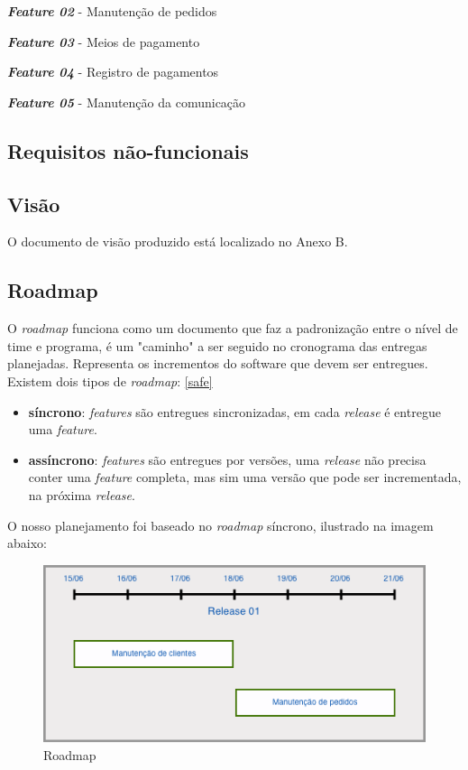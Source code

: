 \textbf{\textit{Feature 02}} - Manutenção de pedidos

\textbf{\textit{Feature 03}} - Meios de pagamento

\textbf{\textit{Feature 04}} - Registro de pagamentos

\textbf{\textit{Feature 05}} - Manutenção da comunicação
\subsection{Requisitos não-funcionais}
\subsection{Visão}
O documento de visão produzido está localizado no Anexo B.
\subsection{Roadmap}
O \textit{roadmap} funciona como um documento que faz a padronização entre o nível de time e programa, é um "caminho" a ser seguido no cronograma das entregas planejadas. Representa os incrementos do software que devem ser entregues. Existem dois tipos de \textit{roadmap}: \ref{safe}
\begin{itemize}
\item \textbf{síncrono}: \textit{features} são entregues sincronizadas, em cada \textit{release} é entregue uma \textit{feature}.
\item \textbf{assíncrono}: \textit{features} são entregues por versões, uma \textit{release} não precisa conter uma \textit{feature} completa, mas sim uma versão que pode ser incrementada, na próxima \textit{release}.
\end{itemize}

O nosso planejamento foi baseado no \textit{roadmap} síncrono, ilustrado na imagem abaixo:
  \begin{figure}[!htbp]
    \centering
    \includegraphics[scale=0.75]{figuras/roadmap}
    \caption[Roadmap]{Roadmap\footnotemark}
    \label{Roadmap}
  \end{figure}
  
